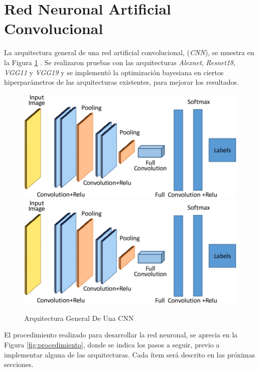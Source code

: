 	\section{Red Neuronal Artificial Convolucional}

	 La arquitectura general de una red artificial convolucional, (\textit{CNN}), se muestra en la Figura \ref{fig:cnnarchitecture} \cite{cnnarchitecture}. Se realizaron pruebas con las arquitecturas \textit{Alexnet}, \textit{Resnet18}, \textit{VGG11} y \textit{VGG19} y se implementó la optimización bayesiana en ciertos hiperparámetros de las arquitecturas existentes, para mejorar los resultados. 
	
	\begin{figure}[ht]
		\centering
		\includegraphics[scale=0.15]{Figs/A-generic-CNN-Architecture.png}
		\includegraphics[scale=0.18]{Figs/A-generic-CNN-Architecture.png}
		\caption{Arquitectura General De Una CNN}
		\label{fig:cnnarchitecture}
	\end{figure}	
	
	El procedimiento realizado para desarrollar la red neuronal, se aprecia en la Figura \ref{fig:procedimiento}, donde se indica los pasos a seguir, previo a implementar alguna de las arquitecturas. Cada ítem será descrito en las próximas secciones.  

